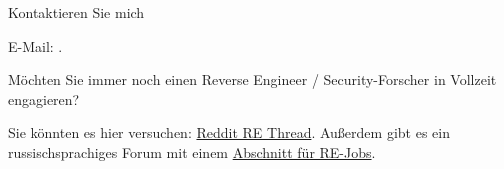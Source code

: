 \large Kontaktieren Sie mich \normalsize

E-Mail: \GTT{\EMAIL}.

\large Möchten Sie immer noch einen Reverse Engineer / Security-Forscher in Vollzeit engagieren? \normalsize

Sie könnten es hier versuchen: \href{https://www.reddit.com/r/ReverseEngineering/comments/49cza0/rreverseengineerings_2015_triannual_hiring_thread/}{Reddit RE Thread}.
Außerdem gibt es ein russischsprachiges Forum mit einem \href{https://forum.reverse4you.org/forumdisplay.php?f=252}{Abschnitt für RE-Jobs}.

\fi %

\vspace*{\fill}
\vfill
